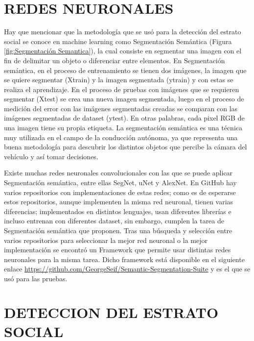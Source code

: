 \section{REDES NEURONALES}
Hay que mencionar que la metodología que se usó para la detección del estrato social se conoce en machine learning como Segmentación Semántica (Figura \ref{fig:Segmentación Semantica}), la cual consiste en segmentar una imagen con el fin de delimitar un objeto o diferenciar entre elementos. En Segmentación semántica, en el proceso de entrenamiento se tienen dos imágenes, la imagen que se quiere segmentar (Xtrain) y la imagen segmentada (ytrain) y con estas se realiza el aprendizaje. En el proceso de pruebas con imágenes que se requieren segmentar (Xtest) se crea una nueva imagen segmentada, luego en el proceso de medición del error con las imágenes segmentadas creadas se comparan con las imágenes segmentadas de dataset (ytest). En otras palabras, cada pixel RGB de una imagen tiene su propia etiqueta. La segmentación semántica es una técnica muy utilizada en el campo de la conducción autónoma, ya que representa una buena metodología para descubrir los distintos objetos que percibe la cámara del vehículo y así tomar decisiones.
  
  
Existe muchas redes neuronales convolucionales con las que se puede aplicar Segmentación semántica, entre ellas SegNet, uNet y AlexNet. En GitHub hay varios repositorios con implementaciones de estas redes; como es de esperarse estos repositorios, aunque implementen la misma red neuronal, tienen varias diferencias; implementados en distintos lenguajes, usan diferentes librerías e incluso entrenan con diferentes dataset, sin embargo, cumplen la tarea de Segmentación semántica que proponen. Tras una búsqueda y selección entre varios repositorios para seleccionar la mejor red neuronal o la mejor implementación se encontró un Framework que permite usar distintas redes neuronales para la misma tarea. Dicho framework está disponible en el siguiente enlace \url{https://github.com/GeorgeSeif/Semantic-Segmentation-Suite} y es el que se usó para las pruebas.
  
\section{DETECCION DEL ESTRATO SOCIAL}

